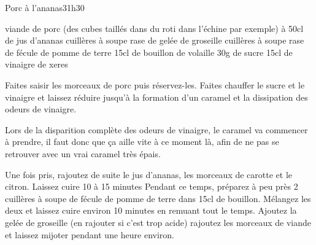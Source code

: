 \begin{recette}{Porc à l'ananas}{3}{1h30}{}

\begin{ingredients}
\ingredient viande de porc (des cubes taillés dans du roti dans l'échine par exemple)
 à 50cl de jus d'ananas
 cuillères à soupe rase de gelée de groseille
 cuillères à soupe rase de fécule de pomme de terre%
\ingredient 15cl de bouillon de volaille
\ingredient 30g de sucre
\ingredient 15cl de vinaigre de xeres
\end{ingredients}

\begin{preparation}
\etape Faites saisir les morceaux de porc puis réservez-les.
\etape Faites chauffer le sucre et le vinaigre et laissez réduire jusqu'à la formation d'un caramel et la dissipation des odeurs de vinaigre.
\begin{attention}
Lors de la disparition complète des odeurs de vinaigre, le caramel va commencer à prendre, il faut donc que ça aille vite à ce moment là, afin de ne pas se retrouver avec un vrai caramel très épais. 
\end{attention}

\etape Une fois pris, rajoutez de suite le jus d'ananas, les morceaux de carotte et le citron. Laissez cuire 10 à 15 minutes
\etape Pendant ce temps, préparez à peu près 2 cuillères à soupe de fécule de pomme de terre dans 15cl de bouillon.
\etape Mélangez les deux et laissez cuire environ 10 minutes en remuant tout le temps. Ajoutez la gelée de groseille (en rajouter si c'est trop acide)
\etape rajoutez les morceaux de viande et laissez mijoter pendant une heure environ.
\end{preparation}
\end{recette}

